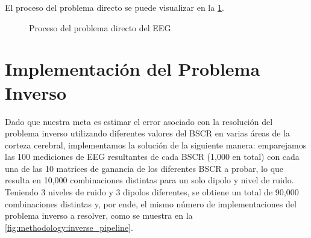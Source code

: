 El proceso del problema directo se puede visualizar en la \cref{fig:methodology:direct_pipeline}.

\begin{figure}[!b]
    \centering
    \caption{Proceso del problema directo del EEG}
    \label{fig:methodology:direct_pipeline}
\end{figure}


\section{Implementación del Problema Inverso}
\label{sec:methodology:inverse_solved}

Dado que nuestra meta es estimar el error asociado con la resolución del problema inverso utilizando diferentes valores del BSCR en varias áreas de la corteza cerebral, implementamos la solución de la siguiente manera: emparejamos las 100 mediciones de EEG resultantes de cada BSCR (1,000 en total) con cada una de las 10 matrices de ganancia de los diferentes BSCR a probar, lo que resulta en 10,000 combinaciones distintas para un solo dipolo y nivel de ruido.
Teniendo 3 niveles de ruido y 3 dipolos diferentes, se obtiene un total de 90,000 combinaciones distintas y, por ende, el mismo número de implementaciones del problema inverso a resolver, como se muestra en la \cref{fig:methodology:inverse_pipeline}.

